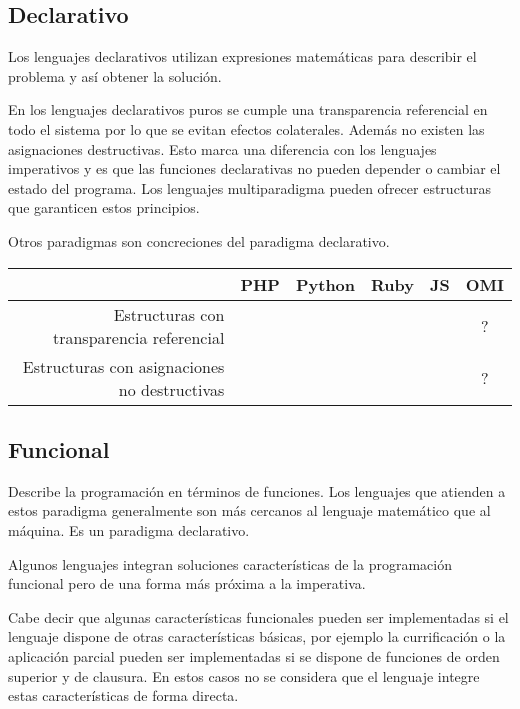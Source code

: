 \subsection {Declarativo}
Los lenguajes declarativos utilizan expresiones matemáticas para describir el problema y así obtener la solución.  

En los lenguajes declarativos puros se cumple una transparencia referencial en todo el sistema por lo
que se evitan efectos colaterales. Además no existen las asignaciones destructivas. Esto marca una diferencia 
con los lenguajes imperativos y es que las funciones declarativas no pueden depender o cambiar el estado del 
programa. Los lenguajes multiparadigma pueden ofrecer estructuras que garanticen estos principios.

Otros paradigmas son concreciones del paradigma declarativo.

\FloatBarrier
\begin{table}[h]
\begin{center}
\begin{tabular}{|r|c|c|c|c|c|} \hline
 & PHP  & Python & Ruby & JS & OMI\\ \hline
Estructuras con transparencia referencial &  &  &  &  & ? \\ \hline
Estructuras con asignaciones no destructivas &  &  &  &  & ? \\ \hline
\end{tabular}
\end{center}
\end{table}
\FloatBarrier

\subsection {Funcional}
Describe la programación en términos de funciones. Los lenguajes que atienden a 
estos paradigma generalmente son más cercanos al lenguaje matemático que al máquina.
Es un paradigma declarativo. 

Algunos lenguajes integran soluciones características de la programación funcional pero de una forma más próxima a la imperativa.

Cabe decir que algunas características funcionales pueden ser implementadas 
si el lenguaje dispone de otras características básicas, 
por ejemplo la currificación o la aplicación parcial pueden 
ser implementadas si se dispone de funciones de orden superior y de clausura. En estos casos 
no se considera que el lenguaje integre estas características de forma directa.

